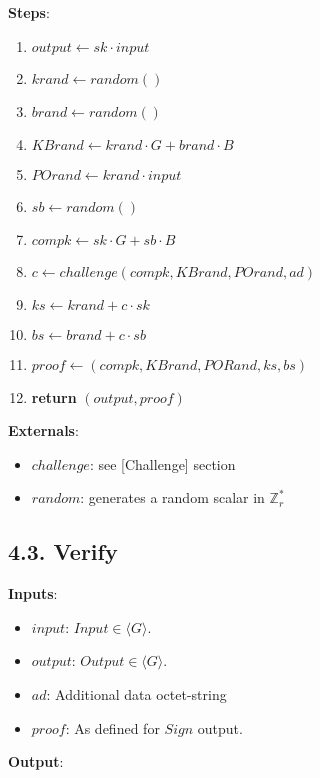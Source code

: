 \documentclass[
]{article}
\providecommand{\tightlist}{%
  \setlength{\itemsep}{0pt}\setlength{\parskip}{0pt}}
\begin{document}
\textbf{Steps}:

\begin{enumerate}
\def\labelenumi{\arabic{enumi}.}
\tightlist
\item
  \(output \leftarrow sk \cdot input\)
\item
  \(krand \leftarrow random()\)
\item
  \(brand \leftarrow random()\)
\item
  \(KBrand \leftarrow krand \cdot G + brand \cdot B\)
\item
  \(POrand \leftarrow krand \cdot input\)
\item
  \(sb \leftarrow random()\)
\item
  \(compk \leftarrow sk \cdot G + sb \cdot B\)
\item
  \(c \leftarrow challenge(compk, KBrand, POrand, ad)\)
\item
  \(ks \leftarrow krand + c \cdot sk\)
\item
  \(bs \leftarrow brand + c \cdot sb\)
\item
  \(proof \leftarrow (compk, KBrand, PORand, ks, bs)\)
\item
  \textbf{return} \((output, proof)\)
\end{enumerate}

\textbf{Externals}:

\begin{itemize}
\tightlist
\item
  \(challenge\): see {[}Challenge{]} section
\item
  \(random\): generates a random scalar in \(\mathbb{Z}^*_r\)
\end{itemize}

\hypertarget{verify-1}{%
\subsection{4.3. Verify}\label{verify-1}}

\textbf{Inputs}:

\begin{itemize}
\tightlist
\item
  \(input\): \(Input \in \langle G \rangle\).
\item
  \(output\): \(Output \in \langle G \rangle\).
\item
  \(ad\): Additional data octet-string
\item
  \(proof\): As defined for \(Sign\) output.
\end{itemize}

\textbf{Output}:
\end{document}
